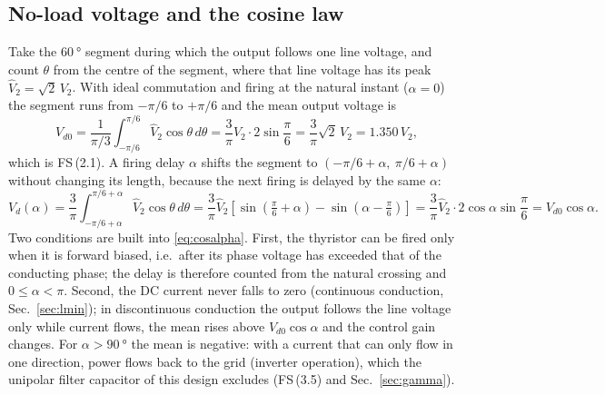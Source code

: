 \documentclass[10pt,a4paper]{scrartcl}
\newcommand{\Vdo}{V_{d0}}
\newcommand{\Vd}{V_{d}}
\newcommand{\Vll}{V_{2}}
\newcommand{\fs}[1]{\textsf{FS}\,(#1)}
\begin{document}
\subsection{No-load voltage and the cosine law}
Take the $\SI{60}{\degree}$ segment during which the output follows one line voltage, and count $\theta$ from the centre of the segment, where that line voltage has its peak $\hat V_2 = \sqrt2\,\Vll$. With ideal commutation and firing at the natural instant ($\alpha = 0$) the segment runs from $-\pi/6$ to $+\pi/6$ and the mean output voltage is
\begin{equation}
\Vdo = \frac{1}{\pi/3}\int_{-\pi/6}^{\pi/6}\hat V_2\cos\theta\,d\theta = \frac{3}{\pi}\hat V_2\cdot2\sin\frac{\pi}{6} = \frac{3}{\pi}\sqrt2\,\Vll = 1.350\,\Vll ,
\label{eq:Vdo}
\end{equation}
which is \fs{2.1}. A firing delay $\alpha$ shifts the segment to $(-\pi/6+\alpha,\ \pi/6+\alpha)$ without changing its length, because the next firing is delayed by the same $\alpha$:
\begin{equation}
\Vd(\alpha) = \frac{3}{\pi}\int_{-\pi/6+\alpha}^{\pi/6+\alpha}\hat V_2\cos\theta\,d\theta = \frac{3}{\pi}\hat V_2\left[\sin\!\left(\tfrac{\pi}{6}+\alpha\right)-\sin\!\left(\alpha-\tfrac{\pi}{6}\right)\right] = \frac{3}{\pi}\hat V_2\cdot2\cos\alpha\sin\frac{\pi}{6} = \Vdo\cos\alpha .
\label{eq:cosalpha}
\end{equation}
Two conditions are built into \eqref{eq:cosalpha}. First, the thyristor can be fired only when it is forward biased, i.e.\ after its phase voltage has exceeded that of the conducting phase; the delay is therefore counted from the natural crossing and $0 \le \alpha < \pi$. Second, the DC current never falls to zero (continuous conduction, Sec.~\ref{sec:lmin}); in discontinuous conduction the output follows the line voltage only while current flows, the mean rises above $\Vdo\cos\alpha$ and the control gain changes. For $\alpha > \SI{90}{\degree}$ the mean is negative: with a current that can only flow in one direction, power flows back to the grid (inverter operation), which the unipolar filter capacitor of this design excludes (\fs{3.5} and Sec.~\ref{sec:gamma}).
\end{document}
